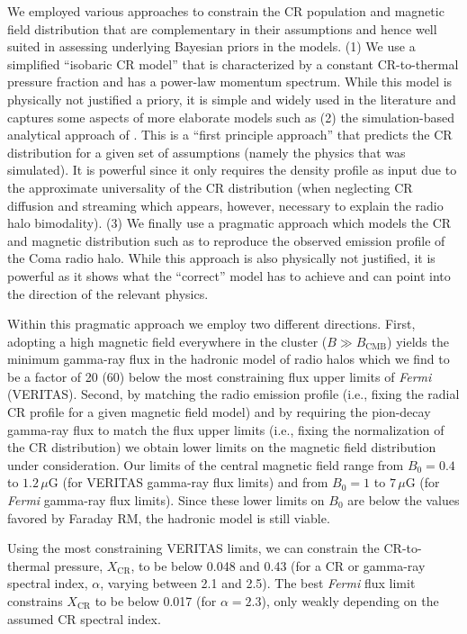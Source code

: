 \documentclass[12pt,manuscript]{aastex}
\newcommand{\rmn}{\mathrm}
\newcommand{\CR}{\mathrm{CR}}
\begin{document}
We employed various approaches to constrain the CR population and magnetic field distribution that are complementary in their assumptions and hence well suited in assessing underlying Bayesian priors in the models. (1) We use a simplified ``isobaric CR model'' that is characterized by a constant CR-to-thermal pressure fraction and has a power-law momentum spectrum.  While this model is physically not justified a priory, it is simple and widely used in the literature and captures some aspects of more elaborate models such as (2) the simulation-based analytical approach of \citet{article:PinzkePfrommer:2010}. This is a ``first principle approach'' that predicts the CR distribution for a given set of assumptions (namely the physics that was simulated). It is powerful since it only requires the density profile as input due to the approximate universality of the CR distribution (when neglecting CR diffusion and streaming which appears, however, necessary to explain the radio halo bimodality). (3) We finally use a pragmatic approach which models the CR and magnetic distribution such as to reproduce the observed emission profile of the Coma radio halo. While this approach is also physically not justified, it is powerful as it shows what the ``correct'' model has to achieve and can point into the direction of the relevant physics.

Within this pragmatic approach we employ two different directions. First, adopting a high magnetic field everywhere in the cluster ($B\gg B_\rmn{CMB}$) yields the minimum gamma-ray flux in the hadronic model of radio halos which we find to be a factor of 20 (60) below the most constraining flux upper limits of {\em Fermi} (VERITAS). Second, by matching the radio emission profile (i.e., fixing the radial CR profile for a given magnetic field model) and by requiring the pion-decay gamma-ray flux to match the flux upper limits (i.e., fixing the normalization of the CR distribution) we obtain lower limits on the magnetic field distribution under consideration. Our limits of the central magnetic field range from $B_{0} = 0.4$ to $1.2\,\mu$G (for VERITAS gamma-ray flux limits) and from $B_{0} = 1$ to $7\,\mu$G (for {\em Fermi} gamma-ray flux limits). Since these lower limits on $B_0$ are below the values favored by Faraday RM, the hadronic model is still viable.

Using the most constraining VERITAS limits, we can constrain the CR-to-thermal pressure, $X_\CR$, to be below 0.048 and 0.43 (for a CR or gamma-ray spectral index, $\alpha$, varying between 2.1 and 2.5).  The best {\em Fermi} flux limit constrains $X_\CR$ to be below 0.017 (for $\alpha=2.3$), only weakly depending on the assumed CR spectral index.
\end{document}
